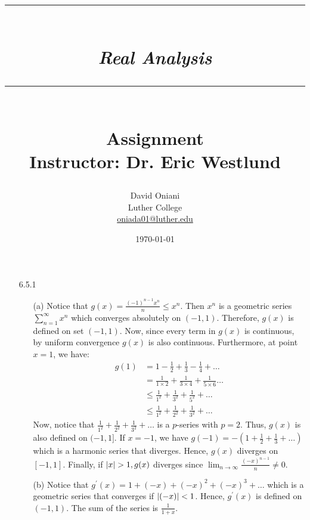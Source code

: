 \documentclass[11pt]{article}
\author{David Oniani\\
        Luther College\\
        \href{mailto:oniada01@luther.edu}{oniada01@luther.edu}}
\title{\rule{\paperwidth - 150pt}{1pt}\textbf{\\\textit{Real Analysis}\\}\rule
{\paperwidth - 150pt}{1pt}\\\textbf{Assignment \textnumero11}\\{\normalsize
Instructor: Dr. Eric Westlund}}
\date{\today}
\DeclarePairedDelimiter\abs{\lvert}{\rvert}%
\begin{document}
\maketitle

%
%
%

\begin{itemize}
    \item[6.5.1]
        \begin{itemize}
            \item[(a)]
                Notice that $g(x) = \frac{(-1)^{n - 1}x^n}{n} \leq x^n$. Then
                $x^n$ is a geometric series $\sum_{n = 1}^\infty x^n$ which
                converges absolutely on $(-1, 1)$. Therefore, $g(x)$ is defined
                on set $(-1, 1)$. Now, since every term in $g(x)$ is
                continuous, by uniform convergence $g(x)$ is also continuous.
                Furthermore, at point $x = 1$, we have:
                \begin{align*}
                    g(1) &= 1 - \frac{1}{2} + \frac{1}{3} - \frac{1}{4} + \dots\\
                         &= \frac{1}{1 \times 2} + \frac{1}{3 \times 4} + \frac{1}{5 \times 6}\dots\\
                         &\leq \frac{1}{1^2} + \frac{1}{3^2} + \frac{1}{5^2} + \dots\\
                         &\leq \frac{1}{1^2} + \frac{1}{2^2} + \frac{1}{3^2} + \dots
                \end{align*}
                Now, notice that $\frac{1}{1^2} + \frac{1}{2^2} + \frac{1}{3^2}
                + \dots$ is a $p$-series with $p = 2$. Thus, $g(x)$ is also
                defined on $(-1, 1]$. If $x = -1$, we have $g(-1) = -(1 +
                \frac{1}{2} + \frac{1}{3} + \dots)$ which is a harmonic series
                that diverges. Hence, $g(x)$ diverges on $[-1, 1]$. Finally,
                if $\abs{x} > 1, g(x)$ diverges since $\lim_{n \to
                \infty}{\frac{(-x)^{n - 1}}{n}} \neq 0$.

            \item[(b)]
                Notice that $g^\prime(x) = 1 + (-x) + (-x)^2 + (-x)^3 + \dots$
                which is a geometric series that converges if $\abs{(-x)} < 1$.
                Hence, $g^\prime(x)$ is defined on $(-1, 1)$. The sum of the
                series is $\frac{1}{1 + x}$.
        \end{itemize}


\end{itemize}
\end{document}
